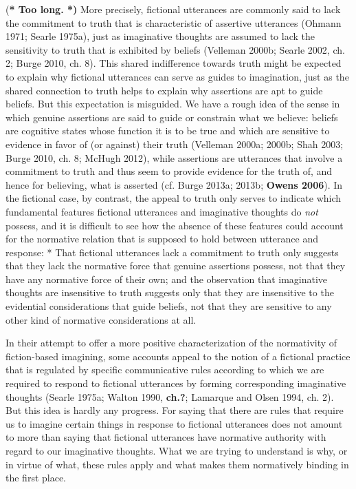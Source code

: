  (\textbf{* Too long. *)} More precisely, fictional utterances are
commonly said to lack the commitment to truth that is characteristic of
assertive utterances (Ohmann 1971; Searle 1975a), just as imaginative
thoughts are assumed to lack the sensitivity to truth that is exhibited
by beliefs (Velleman 2000b; Searle 2002, ch. 2; Burge 2010, ch. 8). This
shared indifference towards truth might be expected to explain why
fictional utterances can serve as guides to imagination, just as the
shared connection to truth helps to explain why assertions are apt to
guide beliefs. But this expectation is misguided. We have a rough idea
of the sense in which genuine assertions are said to guide or constrain
what we believe: beliefs are cognitive states whose function it is to be
true and which are sensitive to evidence in favor of (or against) their
truth (Velleman 2000a; 2000b; Shah 2003; Burge 2010, ch. 8; McHugh
2012), while assertions are utterances that involve a commitment to
truth and thus seem to provide evidence for the truth of, and hence for
believing, what is asserted (cf. Burge 2013a; 2013b; \textbf{Owens
2006}). In the fictional case, by contrast, the appeal to truth only
serves to indicate which fundamental features fictional utterances and
imaginative thoughts do \emph{not} possess, and it is difficult to see
how the absence of these features could account for the normative
relation that is supposed to hold between utterance and
response: * That fictional utterances lack a commitment to truth
only suggests that they lack the normative force that genuine assertions
possess, not that they have any normative force of their own; and the
observation that imaginative thoughts are insensitive to truth suggests
only that they are insensitive to the evidential considerations that
guide beliefs, not that they are sensitive to any other kind of
normative considerations at all.

 In their attempt to offer a more positive characterization of the
normativity of fiction-based imagining, some accounts appeal to the
notion of a fictional practice that is regulated by specific
communicative rules according to which we are required to respond to
fictional utterances by forming corresponding imaginative thoughts
(Searle 1975a; Walton 1990, \textbf{ch.?}; Lamarque and Olsen
1994, ch. 2). But this idea is hardly any progress. For saying that
there are rules that require us to imagine certain things in response to
fictional utterances does not amount to more than saying that fictional
utterances have normative authority with regard to our imaginative
thoughts. What we are trying to understand is why, or in virtue of what,
these rules apply and what makes them normatively binding in the first
place.

